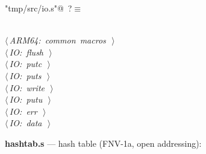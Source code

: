 \documentclass[11pt,a4paper,twoside,openright,DIV=15]{scrbook}
\theoremstyle{definition}
\theoremstyle{plain}
\theoremstyle{remark}
\begin{document}
\begin{flushleft} \small
\begin{minipage}{\linewidth}\label{scrap89}\raggedright\small
{} \verb@"tmp/src/io.s"@\nobreak\ {\footnotesize {?}}$\equiv$
\vspace{-1ex}
\begin{list}{}{} \item
\mbox{}\verb@@\\
\mbox{}\verb@@\hbox{$\langle\,${\itshape ARM64: common macros}\nobreak\ {\footnotesize {}}$\,\rangle$}\verb@@\\
\mbox{}\verb@@\hbox{$\langle\,${\itshape IO: flush}\nobreak\ {\footnotesize {}}$\,\rangle$}\verb@@\\
\mbox{}\verb@@\hbox{$\langle\,${\itshape IO: putc}\nobreak\ {\footnotesize {}}$\,\rangle$}\verb@@\\
\mbox{}\verb@@\hbox{$\langle\,${\itshape IO: puts}\nobreak\ {\footnotesize {}}$\,\rangle$}\verb@@\\
\mbox{}\verb@@\hbox{$\langle\,${\itshape IO: write}\nobreak\ {\footnotesize {}}$\,\rangle$}\verb@@\\
\mbox{}\verb@@\hbox{$\langle\,${\itshape IO: putu}\nobreak\ {\footnotesize {}}$\,\rangle$}\verb@@\\
\mbox{}\verb@@\hbox{$\langle\,${\itshape IO: err}\nobreak\ {\footnotesize {}}$\,\rangle$}\verb@@\\
\mbox{}\verb@@\hbox{$\langle\,${\itshape IO: data}\nobreak\ {\footnotesize {}}$\,\rangle$}\verb@@\\
\mbox{}\verb@@{\NWsep}
\end{list}
\vspace{-1.5ex}
\footnotesize
\begin{list}{}{\setlength{\itemsep}{-\parsep}\setlength{\itemindent}{-\leftmargin}}

\item{}
\end{list}
\end{minipage}\vspace{4ex}
\end{flushleft}
\noindent\textbf{hashtab.s} --- hash table (FNV-1a, open addressing):
\end{document}
